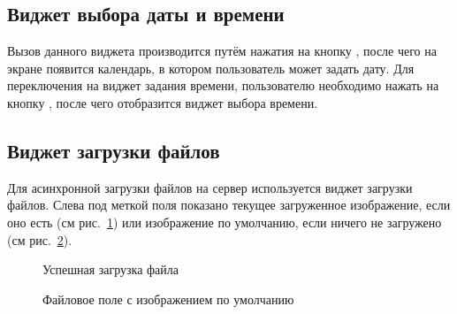 \subsection{Виджет выбора даты и времени}
\label{widget:date_time_picker}
Вызов данного виджета производится путём нажатия на кнопку , после чего на экране появится календарь, в котором пользователь может задать дату.
Для переключения на виджет задания времени, пользователю необходимо нажать на кнопку , после чего отобразится виджет выбора времени.

\subsection{Виджет загрузки файлов}
\label{widget:file_upload}
Для асинхронной загрузки файлов на сервер используется виджет загрузки файлов. Слева под меткой поля показано текущее загруженное изображение, если оно есть (см рис.~\ref{img:widgets:file_upload_ok}) или изображение по умолчанию, если ничего не загружено (см рис.~\ref{img:widget:file_upload_default_logo}). 

\begin{figure}[H]
	\caption{Успешная загрузка файла}
	\label{img:widgets:file_upload_ok}
\end{figure}

\begin{figure}[H]
	\caption{Файловое поле с изображением по умолчанию}
	\label{img:widget:file_upload_default_logo}
\end{figure}

